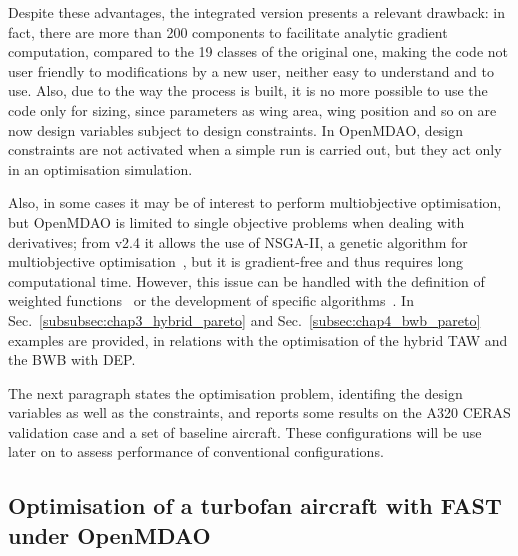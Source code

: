 Despite these advantages, the integrated version presents a relevant drawback: in fact, there are more than 200 components to facilitate analytic gradient computation, compared to the 19 classes of the original one, making the code not user friendly to modifications by a new user, neither easy to understand and to use.
Also, due to the way the process is built, it is no more possible to use the code only for sizing, since parameters as wing area, wing position and so on are now design variables subject to design constraints.
In OpenMDAO, design constraints are not activated when a simple run is carried out, but they act only in an optimisation simulation. 

Also, in some cases it may be of interest to perform multiobjective optimisation, but OpenMDAO is limited to single objective problems when dealing with derivatives; from v2.4 it allows the use of NSGA-II, a genetic algorithm for multiobjective optimisation~\cite{bib:nsga2}, but it is gradient-free and thus requires long computational time. 
However, this issue can be handled with the definition of weighted functions~\cite{bib:chircop, bib:giagkiozis} or the development of specific algorithms~\cite{bib:desideri}. 
In Sec.~\ref{subsubsec:chap3_hybrid_pareto} and Sec.~\ref{subsec:chap4_bwb_pareto} examples are provided, in relations with the optimisation of the hybrid TAW and the BWB with DEP. 

The next paragraph states the optimisation problem, identifing the design variables as well as the constraints, and reports some results on the A320 CERAS validation case and a set of baseline aircraft.
These configurations will be use later on to assess performance of conventional configurations. 

\subsection{Optimisation of a turbofan aircraft with FAST under OpenMDAO}
\label{subsec:chap2_a320_optim_exploration}

